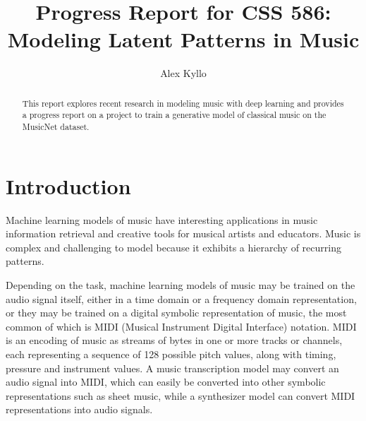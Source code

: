 \documentclass[sigconf,authorversion]{acmart}
\begin{document}
\renewcommand\footnotetextcopyrightpermission[1]{}
\pagestyle{plain}
\title{Progress Report for CSS 586: \\
Modeling Latent Patterns in Music}


\author{Alex Kyllo}

\begin{abstract}
This report explores recent research in modeling music with deep learning and
provides a progress report on a project to train a generative model of classical
music on the MusicNet dataset.
\end{abstract}


\maketitle

\section{Introduction}

Machine learning models of music have interesting applications in music
information retrieval and creative tools for musical artists and educators.
Music is complex and challenging to model because it exhibits a hierarchy of
recurring patterns.

Depending on the task, machine learning models of music may be trained on the
audio signal itself, either in a time domain or a frequency domain
representation, or they may be trained on a digital symbolic representation of
music, the most common of which is MIDI (Musical Instrument Digital Interface)
notation. MIDI is an encoding of music as streams of bytes in one or more tracks
or channels, each representing a sequence of 128 possible pitch values, along
with timing, pressure and instrument values. A music transcription model may
convert an audio signal into MIDI, which can easily be converted into other
symbolic representations such as sheet music, while a synthesizer model can
convert MIDI representations into audio signals.
\end{document}
